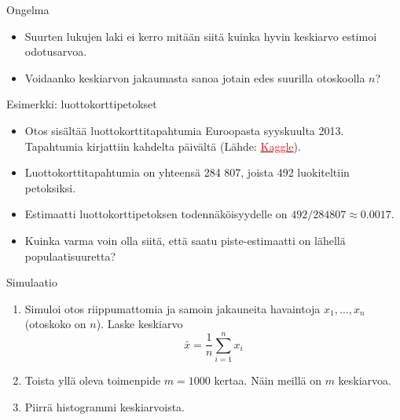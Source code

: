 \documentclass{beamer}
\begin{document}

\begin{frame}{Ongelma}
  \begin{itemize}
    \item Suurten lukujen laki ei kerro mitään siitä kuinka hyvin keskiarvo
    estimoi odotusarvoa.
    \pause
    \item Voidaanko keskiarvon jakaumasta sanoa jotain edes suurilla otoskoolla $n$?
  \end{itemize} 
\end{frame}


\begin{frame}{Esimerkki: luottokorttipetokset}
  \begin{itemize}
    \item Otos sisältää luottokorttitapahtumia Euroopasta syyskuulta 2013.
    Tapahtumia kirjattiin kahdelta päivältä (Lähde:
    \href{https://www.kaggle.com/datasets/mlg-ulb/creditcardfraud?resource=download}{\textcolor{red}{Kaggle}}).
    \pause
    \item Luottokorttitapahtumia on yhteensä 284 807, joista 492 luokiteltiin
    petoksiksi.
    \pause
    \item Estimaatti luottokorttipetoksen todennäköisyydelle on $492 / 284
    807\approx 0.0017$.
    \pause
    \item Kuinka varma voin olla siitä, että saatu piste-estimaatti on lähellä
    populaatisuuretta?
  \end{itemize}
\end{frame}


\begin{frame}{Simulaatio}
  \begin{enumerate}
    \item Simuloi otos riippumattomia ja samoin jakauneita havaintoja $x_1,
    \ldots, x_n$ (otoskoko on $n$). Laske keskiarvo
    \begin{equation*}
      \bar x = \frac{1}{n}\sum_{i=1}^n x_i
    \end{equation*}
    \pause
    \item Toista yllä oleva toimenpide $m = 1000$ kertaa. Näin meillä on $m$
    keskiarvoa.
    \pause
    \item Piirrä histogrammi keskiarvoista.
  \end{enumerate}
\end{frame}
\end{document}
